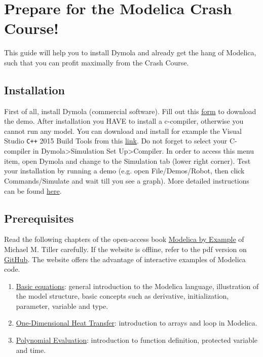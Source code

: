 \documentclass[10pt,a4paper]{article}
\author{Damien Picard}
\begin{document}
\section*{Prepare for the Modelica Crash Course!}

This guide will help you to install Dymola and already get the hang of Modelica, such that you can profit maximally from the Crash Course. 

\subsection*{Installation}

First of all, install Dymola (commercial software).  Fill out this 
\href{http://www.claytex.com/products/dymola/dymola-demo/}{form} to download 
the demo. After installation you HAVE to install a c-compiler, otherwise you 
cannot run any model.  You can download and install for example the Visual 
Studio \texttt{C++} 2015 Build Tools from this  
\href{http://landinghub.visualstudio.com/visual-cpp-build-tools}{link}. 
Do not forget to select your C-compiler in Dymola>Simulation Set Up>Compiler. 
In order to access this menu item, open Dymola and change to the Simulation tab 
(lower right corner).
Test your installation by running a demo (e.g. open File/Demos/Robot, then 
click Commands/Simulate and wait till you see a graph). 
More detailed 
instructions can be found 
\href{https://www.3ds.com/fileadmin/PRODUCTS/CATIA/DYMOLA/PDF/Installation.pdf}{here}.

\subsection*{Prerequisites}
Read the following chapters of the open-access book  
\href{http://book.xogeny.com/}{Modelica by Example} of Michael M. Tiller 
carefully.
If the website is offline, refer to the pdf version on \href{https://github.com/open-ideas/__CrashCourse__/blob/master/2017-2018/ModelicaByExample.pdf}{GitHub}. The website offers the advantage of interactive examples of Modelica code.

\begin{enumerate}
\item \href{http://book.xogeny.com/behavior/equations/}{Basic equations}: general introduction to the Modelica language, illustration of the model structure, basic concepts such as derivative, initialization, parameter, variable and type.
\item \href{http://book.xogeny.com/behavior/arrays/oned/}{One-Dimensional Heat Transfer}: introduction to arrays and loop in Modelica.
\item \href{http://book.xogeny.com/behavior/functions/polynomial/}{Polynomial Evaluation}: introduction to function definition, protected variable and time.

\end{enumerate}
\end{document}
